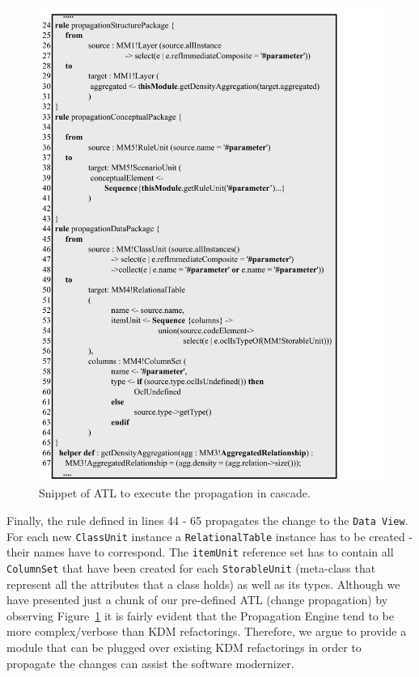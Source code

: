 \begin{figure}[h]	
	\centering
	\includegraphics[scale=0.516]{figuras/ATLPRopagationSBESFormatted}
	\caption{Snippet of ATL to execute the propagation in cascade.}
	\label{fig:ATLPropagation}
\end{figure}

 Finally, the rule defined in lines 44 - 65 propagates the change to the \texttt{Data View}. For each new \texttt{ClassUnit} instance a \texttt{RelationalTable} instance has to be created - their names have to correspond. The \texttt{itemUnit} %
reference set has to contain all \texttt{ColumnSet} that have been created for each \texttt{StorableUnit} (meta-class that represent all the attributes that a class holds) as well as its types.
Although we have presented just a chunk of our pre-defined ATL (change propagation) by observing Figure~\ref{fig:ATLPropagation} it is fairly evident that the Propagation Engine tend to be more complex/verbose than KDM refactorings. Therefore, we argue to provide a module that can be plugged over existing KDM refactorings in order to propagate the changes can assist the software modernizer.


